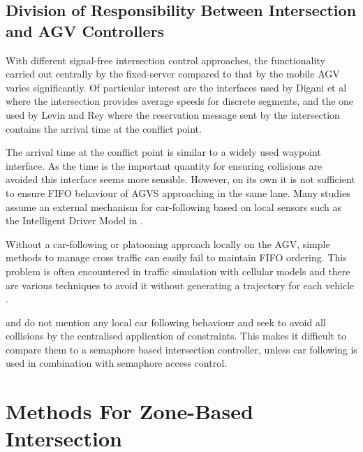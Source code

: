 \documentclass[]{article}
\begin{document}
\subsection{Division of Responsibility Between Intersection and AGV Controllers}
With different signal-free intersection control approaches, the functionality carried out centrally by the fixed-server compared to that by the mobile AGV varies significantly. Of particular interest are the interfaces used by Digani et al \cite{Digani2019} where the intersection provides average speeds for discrete segments, and the one used by Levin and Rey \cite{Levin2017} where the reservation message sent by the intersection contains the arrival time at the conflict point. 

The arrival time at the conflict point is similar to a widely used waypoint interface. As the time is the important quantity for ensuring collisions are avoided this interface seems more sensible. However, on its own it is not sufficient to ensure FIFO behaviour of AGVS approaching in the same lane. Many studies assume an external mechanism for car-following based on local sensors such as the Intelligent Driver Model in \cite{He2020}.  

Without a car-following or platooning approach locally on the AGV, simple methods to manage cross traffic can easily fail to maintain FIFO ordering. This problem is often encountered in traffic simulation with cellular models and there are various techniques to avoid it without generating a trajectory for each vehicle \cite{Carey2014}. 

\cite{Levin2017} and \cite{Digani2019} do not mention any local car following behaviour and seek to avoid all collisions by the centralised application of constraints. This makes it difficult to compare them to a semaphore based intersection controller, unless car following is used in combination with semaphore access control.  

\section{Methods For Zone-Based Intersection}
\end{document}
